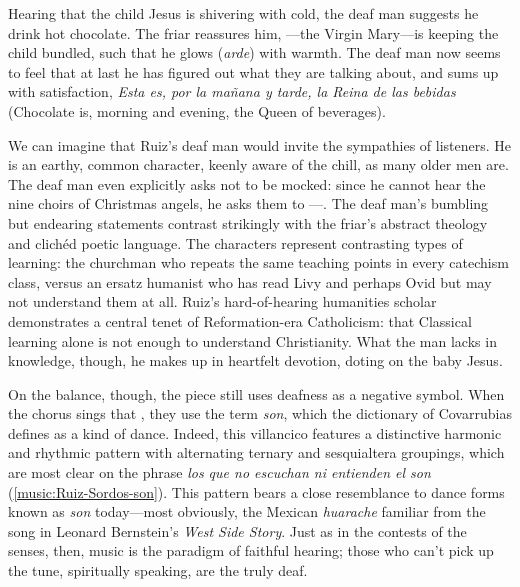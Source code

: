 Hearing that the child Jesus is shivering with cold, the deaf man suggests he
drink hot chocolate.
The friar reassures him, ---the Virgin Mary---is keeping the
child bundled, such that he glows (\emph{arde}) with warmth.
The deaf man now seems to feel that at last he has figured out what they are
talking about, and sums up with satisfaction, \emph{Esta es, por la mañana y
tarde, la Reina de las bebidas} (Chocolate is, morning and evening, the Queen of
beverages).

We can imagine that Ruiz's deaf man would invite the sympathies of listeners.
He is an earthy, common character, keenly aware of the chill, as many older men
are.
The deaf man even explicitly asks not to be mocked: since he cannot hear the
nine choirs of Christmas angels, he asks them to ---.
The deaf man's bumbling but endearing statements contrast strikingly with the
friar's abstract theology and clichéd poetic language.
The characters represent contrasting types of learning: the churchman who
repeats the same teaching points in every catechism class, versus an ersatz
humanist who has read Livy and perhaps Ovid but may not understand them at all.
Ruiz's hard-of-hearing humanities scholar demonstrates a central tenet of
Reformation-era Catholicism: that Classical learning alone is not enough to
understand Christianity.%
    \Autocite
    [206: .] 
    {Erasmus:Dolan}
What the man lacks in knowledge, though, he makes up in heartfelt devotion,
doting on the baby Jesus.

On the balance, though, the piece still uses deafness as a negative symbol.
When the chorus sings that , they use the term \emph{son}, which the dictionary of
Covarrubias defines as a kind of dance.
Indeed, this villancico features a distinctive harmonic and rhythmic pattern
with alternating ternary and sesquialtera groupings, which are most clear on the
phrase \emph{los que no escuchan ni entienden el son}
(\cref{music:Ruiz-Sordos-son}).
This pattern bears a close resemblance to dance forms known as \emph{son}
today---most obviously, the Mexican \emph{huarache} familiar from the song
 in Leonard Bernstein's \emph{West Side Story}.%
    \Autocites
    []{Grove}
    {Wells:WestSideStory}
Just as in the contests of the senses, then, music is the paradigm of faithful
hearing; those who can't pick up the tune, spiritually speaking, are the truly
deaf.

